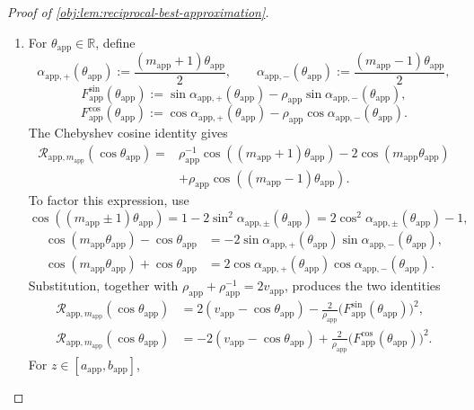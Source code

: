 \begin{proof}[Proof of \cref{obj:lem:reciprocal-best-approximation}]
\begin{enumerate}
\item For \(\theta_{\mathrm{app}}\in\mathbb R\), define
\[
\alpha_{\mathrm{app},+}(\theta_{\mathrm{app}})
:=\frac{(m_{\mathrm{app}}+1)\theta_{\mathrm{app}}}{2},
\qquad
\alpha_{\mathrm{app},-}(\theta_{\mathrm{app}})
:=\frac{(m_{\mathrm{app}}-1)\theta_{\mathrm{app}}}{2},
\]
\[
F_{\mathrm{app}}^{\sin}(\theta_{\mathrm{app}})
:=
\sin\alpha_{\mathrm{app},+}(\theta_{\mathrm{app}})
-\rho_{\mathrm{app}}
\sin\alpha_{\mathrm{app},-}(\theta_{\mathrm{app}}),
\]
\[
F_{\mathrm{app}}^{\cos}(\theta_{\mathrm{app}})
:=
\cos\alpha_{\mathrm{app},+}(\theta_{\mathrm{app}})
-\rho_{\mathrm{app}}
\cos\alpha_{\mathrm{app},-}(\theta_{\mathrm{app}}).
\]
The Chebyshev cosine identity gives
\[
\begin{aligned}
\mathcal R_{\mathrm{app},m_{\mathrm{app}}}
(\cos\theta_{\mathrm{app}})
={}&
\rho_{\mathrm{app}}^{-1}
\cos((m_{\mathrm{app}}+1)\theta_{\mathrm{app}})
-2\cos(m_{\mathrm{app}}\theta_{\mathrm{app}})\\
&+\rho_{\mathrm{app}}
\cos((m_{\mathrm{app}}-1)\theta_{\mathrm{app}}).
\end{aligned}
\]
To factor this expression, use
\[
\cos((m_{\mathrm{app}}\pm1)\theta_{\mathrm{app}})
=
1-2\sin^2\alpha_{\mathrm{app},\pm}(\theta_{\mathrm{app}})
=
2\cos^2\alpha_{\mathrm{app},\pm}(\theta_{\mathrm{app}})-1,
\]
\[
\begin{aligned}
\cos(m_{\mathrm{app}}\theta_{\mathrm{app}})
-\cos\theta_{\mathrm{app}}
&=-2\sin\alpha_{\mathrm{app},+}(\theta_{\mathrm{app}})
\sin\alpha_{\mathrm{app},-}(\theta_{\mathrm{app}}),\\
\cos(m_{\mathrm{app}}\theta_{\mathrm{app}})
+\cos\theta_{\mathrm{app}}
&=2\cos\alpha_{\mathrm{app},+}(\theta_{\mathrm{app}})
\cos\alpha_{\mathrm{app},-}(\theta_{\mathrm{app}}).
\end{aligned}
\]
Substitution, together with
\(\rho_{\mathrm{app}}+\rho_{\mathrm{app}}^{-1}
=2v_{\mathrm{app}}\), produces the two identities
\[
\begin{aligned}
\mathcal R_{\mathrm{app},m_{\mathrm{app}}}
(\cos\theta_{\mathrm{app}})
&=
2(v_{\mathrm{app}}-\cos\theta_{\mathrm{app}})
-\frac{2}{\rho_{\mathrm{app}}}
\bigl(F_{\mathrm{app}}^{\sin}(\theta_{\mathrm{app}})\bigr)^2,\\
\mathcal R_{\mathrm{app},m_{\mathrm{app}}}
(\cos\theta_{\mathrm{app}})
&=
-2(v_{\mathrm{app}}-\cos\theta_{\mathrm{app}})
+\frac{2}{\rho_{\mathrm{app}}}
\bigl(F_{\mathrm{app}}^{\cos}(\theta_{\mathrm{app}})\bigr)^2.
\end{aligned}
\]
For \(z\in[a_{\mathrm{app}},b_{\mathrm{app}}]\),

\end{enumerate}
\end{proof}
